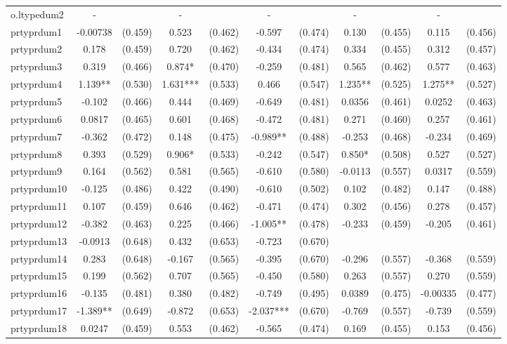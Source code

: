 \documentclass[]{article}
\begin{document}
\begin{tabular}{lcccccccccc}
o.ltypedum2 & - &  & - &  & - &  & - &  & - &  \\
prtyprdum1 & -0.00738 & (0.459) & 0.523 & (0.462) & -0.597 & (0.474) & 0.130 & (0.455) & 0.115 & (0.456) \\
prtyprdum2 & 0.178 & (0.459) & 0.720 & (0.462) & -0.434 & (0.474) & 0.334 & (0.455) & 0.312 & (0.457) \\
prtyprdum3 & 0.319 & (0.466) & 0.874* & (0.470) & -0.259 & (0.481) & 0.565 & (0.462) & 0.577 & (0.463) \\
prtyprdum4 & 1.139** & (0.530) & 1.631*** & (0.533) & 0.466 & (0.547) & 1.235** & (0.525) & 1.275** & (0.527) \\
prtyprdum5 & -0.102 & (0.466) & 0.444 & (0.469) & -0.649 & (0.481) & 0.0356 & (0.461) & 0.0252 & (0.463) \\
prtyprdum6 & 0.0817 & (0.465) & 0.601 & (0.468) & -0.472 & (0.481) & 0.271 & (0.460) & 0.257 & (0.461) \\
prtyprdum7 & -0.362 & (0.472) & 0.148 & (0.475) & -0.989** & (0.488) & -0.253 & (0.468) & -0.234 & (0.469) \\
prtyprdum8 & 0.393 & (0.529) & 0.906* & (0.533) & -0.242 & (0.547) & 0.850* & (0.508) & 0.527 & (0.527) \\
prtyprdum9 & 0.164 & (0.562) & 0.581 & (0.565) & -0.610 & (0.580) & -0.0113 & (0.557) & 0.0317 & (0.559) \\
prtyprdum10 & -0.125 & (0.486) & 0.422 & (0.490) & -0.610 & (0.502) & 0.102 & (0.482) & 0.147 & (0.488) \\
prtyprdum11 & 0.107 & (0.459) & 0.646 & (0.462) & -0.471 & (0.474) & 0.302 & (0.456) & 0.278 & (0.457) \\
prtyprdum12 & -0.382 & (0.463) & 0.225 & (0.466) & -1.005** & (0.478) & -0.233 & (0.459) & -0.205 & (0.461) \\
prtyprdum13 & -0.0913 & (0.648) & 0.432 & (0.653) & -0.723 & (0.670) &  &  &  &  \\
prtyprdum14 & 0.283 & (0.648) & -0.167 & (0.565) & -0.395 & (0.670) & -0.296 & (0.557) & -0.368 & (0.559) \\
prtyprdum15 & 0.199 & (0.562) & 0.707 & (0.565) & -0.450 & (0.580) & 0.263 & (0.557) & 0.270 & (0.559) \\
prtyprdum16 & -0.135 & (0.481) & 0.380 & (0.482) & -0.749 & (0.495) & 0.0389 & (0.475) & -0.00335 & (0.477) \\
prtyprdum17 & -1.389** & (0.649) & -0.872 & (0.653) & -2.037*** & (0.670) & -0.769 & (0.557) & -0.739 & (0.559) \\
prtyprdum18 & 0.0247 & (0.459) & 0.553 & (0.462) & -0.565 & (0.474) & 0.169 & (0.455) & 0.153 & (0.456) \\

\end{tabular}
\end{document}

